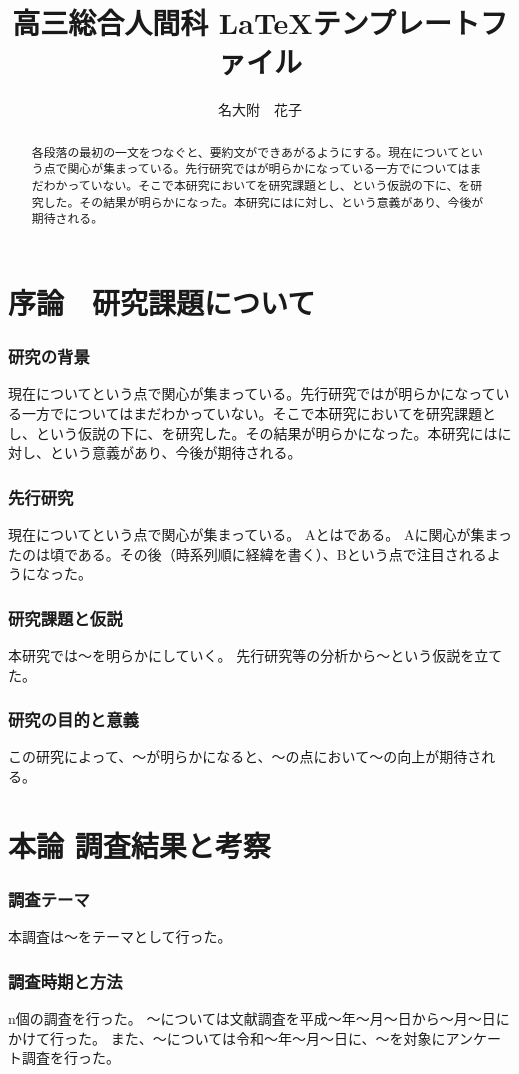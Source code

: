 \documentclass[10.5pt,twocolumn]{jsarticle}
\title{\fontsize{14.6pt}{0cm}\gt
高三総合人間科 \LaTeX テンプレートファイル}
\author{\fontsize{12.5pt}{0cm}\mc
名大附　花子}
\date{}
\begin{document}
\begin{abstract}
各段落の最初の一文をつなぐと、要約文ができあがるようにする。現在についてという点で関心が集まっている。先行研究ではが明らかになっている一方でについてはまだわかっていない。そこで本研究においてを研究課題とし、という仮説の下に、を研究した。その結果が明らかになった。本研究にはに対し、という意義があり、今後が期待される。
\end{abstract}


\part{序論　研究課題について}
\section{研究の背景}
現在についてという点で関心が集まっている。先行研究ではが明らかになっている一方でについてはまだわかっていない。そこで本研究においてを研究課題とし、という仮説の下に、を研究した。その結果が明らかになった。本研究にはに対し、という意義があり、今後が期待される。

\section{先行研究}
現在についてという点で関心が集まっている。
Aとはである。
Aに関心が集まったのは頃である。その後（時系列順に経緯を書く）、Bという点で注目されるようになった。

\section{研究課題と仮説}
本研究では〜を明らかにしていく。
先行研究等の分析から〜という仮説を立てた。

\section{研究の目的と意義}
この研究によって、〜が明らかになると、〜の点において〜の向上が期待される。

\part{本論 調査結果と考察}
\section{調査テーマ}
本調査は〜をテーマとして行った。

\section{調査時期と方法}
n個の調査を行った。
〜については文献調査を平成〜年〜月〜日から〜月〜日にかけて行った。
また、〜については令和〜年〜月〜日に、〜を対象にアンケート調査を行った。
\end{document}
